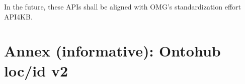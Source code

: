 \documentclass[10pt,fleqn,%
\ifpretendfinal
final%
\else
draft%
\fi,
]{scrreprt}
\newcommand{\infannex}[1]{ \chapter{Annex (informative): #1} }
\begin{document}
In the future, these APIs shall be aligned with OMG's standardization
effort API4KB.


\infannex{Ontohub loc/id v2}\label{loc/id}



\lstset{ %
  basicstyle=\small\ttfamily,
  breakatwhitespace=true,         %
  breaklines=true,                 %
  captionpos=b,                    %
  extendedchars=true,              %
  frame=single,                    %
  keepspaces=true,                 %
  numbersep=5pt,                   %
}


\newenvironment{oitemize}{%
  \renewcommand{\labelitemii}{$\bullet$}%
  \vspace{-15pt}
  \begin{itemize}}
  {\end{itemize}}
\end{document}
